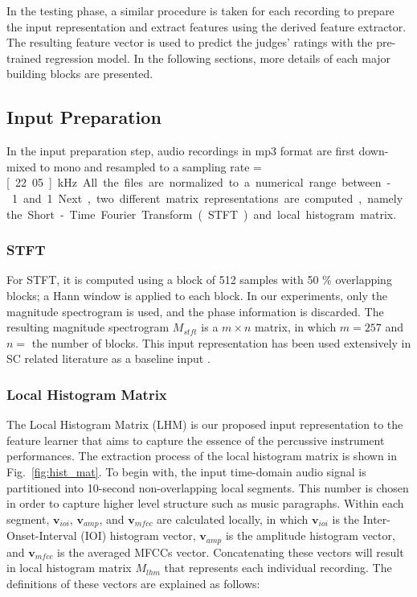\documentclass{article}
\begin{document}
In the testing phase, a similar procedure is taken for each recording to prepare the input representation and extract features using the derived feature extractor. The resulting feature vector is used to predict the judges' ratings with the pre-trained regression model. In the following sections, more details of each major building blocks are presented. 

\subsection{Input Preparation}\label{subsec:input}
In the input preparation step, audio recordings in mp3 format are first down-mixed to mono and resampled to a sampling rate = \unit[22.05]{kHz}. All the files are normalized to a numerical range between -1 and 1. Next, two different matrix representations are computed, namely the Short-Time Fourier Transform (STFT) and local histogram matrix. 

\subsubsection{STFT}\label{subsec:stft}
For STFT, it is computed using a block of 512 samples with 50 \% overlapping blocks; a Hann window is applied to each block. In our experiments, only the magnitude spectrogram is used, and the phase information is discarded. The resulting magnitude spectrogram $M_{stft}$ is a $m \times n$ matrix, in which $m = 257$ and $n = $ the number of blocks. This input representation has been used extensively in SC related literature as a baseline input \cite{Su2014Guitar, Su2014Violin}. 

\subsubsection{Local Histogram Matrix}
The Local Histogram Matrix (LHM) is our proposed input representation to the feature learner that aims to capture the essence of the percussive instrument performances. The extraction process of the local histogram matrix is shown in Fig.~\ref{fig:hist_mat}. To begin with, the input time-domain audio signal is partitioned into 10-second non-overlapping local segments. This number is chosen in order to capture higher level structure such as music paragraphs. Within each segment, $\mathbf{v}_{ioi}$, $\mathbf{v}_{amp}$, and $\mathbf{v}_{mfcc}$ are calculated locally, in which $\mathbf{v}_{ioi}$ is the Inter-Onset-Interval (IOI) histogram vector, $\mathbf{v}_{amp}$ is the amplitude histogram vector, and $\mathbf{v}_{mfcc}$ is the averaged MFCCs vector. Concatenating these vectors will result in local histogram matrix $M_{lhm}$ that represents each individual recording. The definitions of these vectors are explained as follows:
\end{document}
